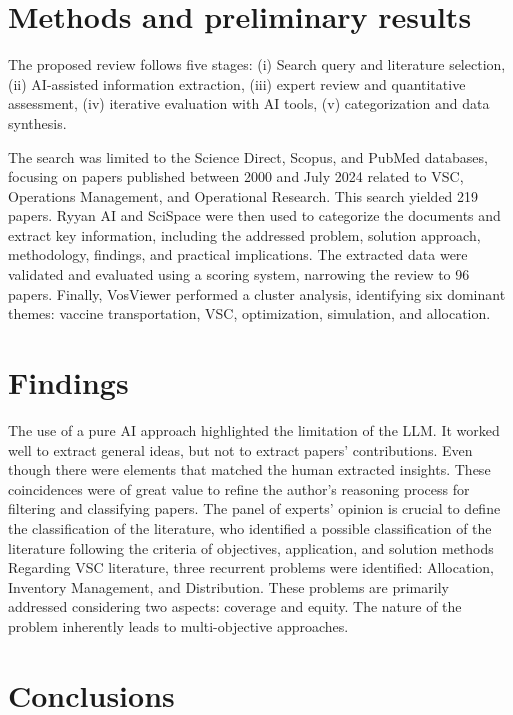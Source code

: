\documentclass[journal,onecolumn]{IEEEtran}
\begin{document}
\section{Methods and preliminary results}

The proposed review follows five stages: 
(i) Search query and literature selection, 
(ii) AI-assisted information extraction, 
(iii) expert review and quantitative assessment, 
(iv) iterative evaluation with AI tools, 
(v) categorization and data synthesis.

The search was limited to the Science Direct, Scopus, and PubMed databases, focusing on papers published between 2000 and July 2024 related to VSC, Operations Management, and Operational Research. This search yielded 219 papers. Ryyan AI and SciSpace were then used to categorize the documents and extract key information, including the addressed problem, solution approach, methodology, findings, and practical implications. The extracted data were validated and evaluated using a scoring system, narrowing the review to 96 papers. Finally, VosViewer performed a cluster analysis, identifying six dominant themes: vaccine transportation, VSC, optimization, simulation, and allocation.


\section{Findings}

The use of a pure AI approach highlighted the limitation of the LLM. It worked well to extract general ideas, but not to extract papers' contributions. Even though there were elements that matched the human extracted insights. These coincidences were of great value to refine the author's reasoning process for filtering and classifying papers. The panel of experts’ opinion is crucial to define the classification of the literature, who identified a possible classification of the literature following the criteria of objectives, application, and solution methods Regarding VSC literature,  three recurrent problems were identified: Allocation, Inventory Management, and Distribution. These problems are primarily addressed considering two aspects: coverage and equity. The nature of the problem inherently leads to multi-objective approaches.

\section{Conclusions}
\end{document}
